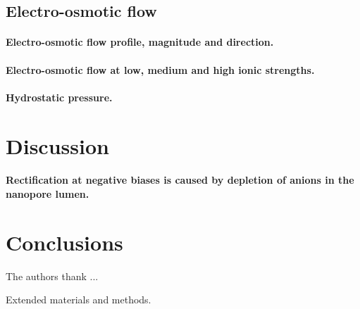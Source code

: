 \documentclass[journal=ancac3, manuscript=article, etalmode=truncate,maxauthors=0]{achemso}
\begin{document}
\subsection{Electro-osmotic flow}


\paragraph{Electro-osmotic flow profile, magnitude and direction.}
\paragraph{Electro-osmotic flow at low, medium and high ionic strengths.}
\paragraph{Hydrostatic pressure.}



\section{Discussion}\label{sect:discussion}

\paragraph{Rectification at negative biases is caused by depletion of anions in the nanopore lumen.}

\section{Conclusions}\label{sect:conclusions}

\begin{acknowledgement}
The authors thank ...
\end{acknowledgement}


\begin{suppinfo}
	Extended materials and methods.
\end{suppinfo}








\newpage %


%
\end{document}
